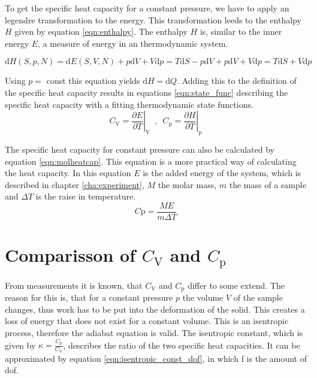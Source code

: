 To get the specific heat capacity for a constant pressure, we have to apply an legendre transformation to the energy. This transformation leeds to the enthalpy $H$ given by equation \ref{eqn:enthalpy}.
The enthalpy $H$ is, similar to the inner energy $E$, a measure of energy in an thermodynamic system.

\begin{equation}
    \label{eqn:enthalpy}
    \mathrm{d}H(S,p,N) = \mathrm{d}E(S,V,N) + p\mathrm{d}V + V\mathrm{d}p = T\mathrm{d}S - p\mathrm{d}V + p\mathrm{d}V + V\mathrm{d}p = T\mathrm{d}S + V\mathrm{d}p
\end{equation}

Using $p =$ const this equation yields $\mathrm{d}H = \mathrm{d}Q$. Adding this to the definition of the specific heat capacity results in equations \ref{eqn:state_func} describing the specific 
heat capacity with a fitting thermodynamic state functions.
\begin{equation}
    \label{eqn:state_func}
    C_\mathrm{V} = \left.\frac{\partial E}{\partial T} \right\vert_\mathrm{V} \,\,\,,\,\,\, C_\mathrm{p} = \left.\frac{\partial H}{\partial T} \right\vert_\mathrm{p}
\end{equation}

The specific heat capacity for constant pressure can also be calculated by equation \ref{eqn:molheatcap}. This equation is a more practical way of calculating the heat capacity. In 
this equation $E$ is the added energy of the system, which is described in chapter \ref{cha:experiment}, $M$ the molar mass, $m$ the mass of a sample and $\Delta T$ is the raise in temperature.
\begin{equation}
    \label{eqn:molheatcap}
    C\mathrm{p} = \frac{ME}{m\Delta T}
\end{equation}
\section{Comparisson of $C_\mathrm{V}$ and $C_\mathrm{p}$}
From measurements it is known, that $C_\mathrm{V}$ and $C_\mathrm{p}$ differ to some extend. The reason for this is, that for a constant pressure $p$ the volume $V$ of the sample 
changes, thus work has to be put into the deformation of the solid. This creates a loss of energy that does not exist for a constant volume. This is an isentropic process, therefore 
the adiabat equation is valid. The isentropic constant, which is given by $\kappa = \frac{C_\mathrm{p}}{C_\mathrm{V}}$, describes the ratio of the two specific heat capacities. It can 
be approximated by equation \ref{eqn:isentropic_const_dof}, in which f is the amount of dof. 

